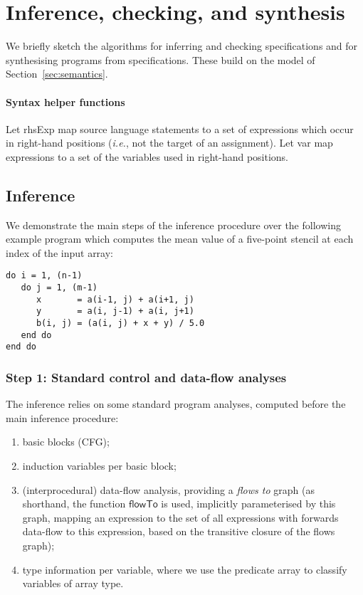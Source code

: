 \documentclass[9pt]{sigplanconf}
\newcounter{block}
\theoremstyle{definition}
\newcommand{\ie}{\emph{i.e.}}
\newcommand{\arrayTy}{\textsf{array}}
\newcommand{\rhsExp}{\textsf{rhsExp}}
\newcommand{\var}{\textsf{var}}
\begin{document}
\section{Inference, checking, and synthesis}
\label{sec:analysis}

\noindent
We briefly sketch the algorithms for inferring and checking
specifications and for synthesising programs from specifications.
These build on the model of Section~\ref{sec:semantics}.

\paragraph{Syntax helper functions}
Let \rhsExp{} map source language statements to a
set of expressions which occur in right-hand positions (\ie{}, not the
target of an assignment). Let \var{} map expressions to a
set of the variables used in right-hand positions.

\subsection{Inference\label{subsec:inference}}

We demonstrate the main steps of the inference procedure over the
following example program which computes the mean value
of a five-point stencil at each index of the input array:
\begin{verbatim}
do i = 1, (n-1)
   do j = 1, (m-1)
      x       = a(i-1, j) + a(i+1, j)
      y       = a(i, j-1) + a(i, j+1)
      b(i, j) = (a(i, j) + x + y) / 5.0
   end do
end do
\end{verbatim}
\subsubsection{Step 1: Standard control and data-flow analyses}
\label{sec:inf-step1}

The inference relies on some standard program analyses, computed
before the main inference procedure:
%
\begin{enumerate}
\item basic blocks (CFG);
\item induction variables per basic block;
\item (interprocedural) data-flow analysis, providing a \emph{flows to}
  graph (as shorthand, the function
  $\mathsf{flowTo}$ is used, implicitly parameterised by this graph,
  mapping an expression to the set of all expressions
  with forwards data-flow to this expression, based on the transitive
  closure of the flows graph);
\item type information per variable, where we use the predicate
\arrayTy{} to classify variables of array type.
\end{enumerate}
%
\end{document}
